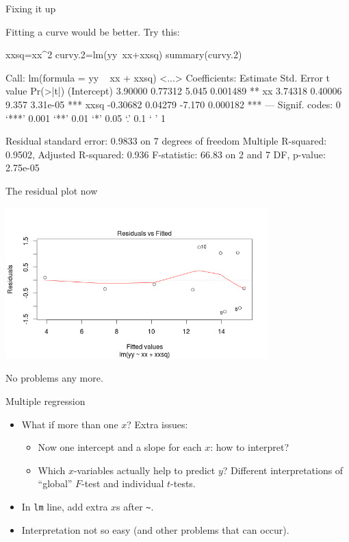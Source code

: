 \begin{frame}[fragile]{Fixing it up}


\vspace{3ex}

Fitting a curve would be better. Try this:

{\scriptsize
\begin{semiverbatim}
xxsq=xx^2
curvy.2=lm(yy~xx+xxsq)
summary(curvy.2)

Call:
lm(formula = yy ~ xx + xxsq)
<...>
Coefficients:
            Estimate Std. Error t value Pr(>|t|)    
(Intercept)  3.90000    0.77312   5.045 0.001489 ** 
xx           3.74318    0.40006   9.357 3.31e-05 ***
xxsq        -0.30682    0.04279  -7.170 0.000182 ***
---
Signif. codes:  0 ‘***’ 0.001 ‘**’ 0.01 ‘*’ 0.05 ‘.’ 0.1 ‘ ’ 1 

Residual standard error: 0.9833 on 7 degrees of freedom
Multiple R-squared: 0.9502,	Adjusted R-squared: 0.936 
F-statistic: 66.83 on 2 and 7 DF,  p-value: 2.75e-05 
\end{semiverbatim}
}

\end{frame}


\begin{frame}{The residual plot now}

\includegraphics[width=4in]{curvy-resid2}

No problems any more.  

\end{frame}


\begin{frame}[fragile]{Multiple regression}

  \begin{itemize}
  \item What if more than one $x$? Extra issues: %
    \begin{itemize}
    \item Now one intercept and a slope for each $x$: how to interpret?
    \item Which $x$-variables actually help to predict $y$?
 Different interpretations of ``global'' $F$-test and individual $t$-tests.
    \end{itemize}
  \item In \verb-lm- line, add extra $x$s after \verb-~-.
  \item Interpretation not so easy (and other problems that can occur).
  \end{itemize}

\end{frame}

